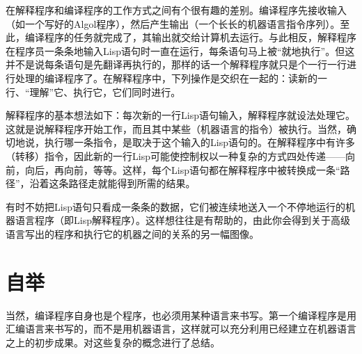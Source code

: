 在解释程序和编译程序的工作方式之间有个很有趣的差别。编译程序先接收输入（如一个写好的Algol程序），然后产生输出（一个长长的机器语言指令序列）。至此，编译程序的任务就完成了，其输出就交给计算机去运行。与此相反，解释程序在程序员一条条地输入Lisp语句时一直在运行，每条语句马上被“就地执行”。但这并不是说每条语句是先翻译再执行的，那样的话一个解释程序就只是个一行一行进行处理的编译程序了。在解释程序中，下列操作是交织在一起的：读新的一行、“理解”它、执行它，它们同时进行。

解释程序的基本想法如下：每次新的一行Lisp语句输入，解释程序就设法处理它。这就是说解释程序开始工作，而且其中某些（机器语言的指令）被执行。当然，确切地说，执行哪一条指令，是取决于这个输入的Lisp语句的。在解释程序中有许多（转移）指令，因此新的一行Lisp可能使控制权以一种复杂的方式四处传递——向前，向后，再向前，等等。这样，每个Lisp语句都在解释程序中被转换成一条“路径”，沿着这条路径走就能得到所需的结果。

有时不妨把Lisp语句只看成一条条的数据，它们被连续地送入一个不停地运行的机器语言程序（即Lisp解释程序）。这样想往往是有帮助的，由此你会得到关于高级语言写出的程序和执行它的机器之间的关系的另一幅图像。

\section{自举}

当然，编译程序自身也是个程序，也必须用某种语言来书写。第一个编译程序是用汇编语言来书写的，而不是用机器语言，这样就可以充分利用已经建立在机器语言之上的初步成果。对这些复杂的概念进行了总结。

\begin{figure}
\begin{lrbox}{\TEMPBOX}%
\end{lrbox}
\end{figure}

